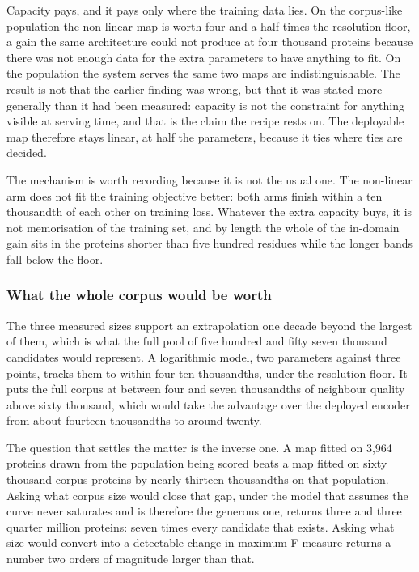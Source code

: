 \begin{table}[htbp]
  \centering
  \caption{A non-linear map against a linear one, both fitted on sixty thousand
  proteins for the same hundred passes, scored on both populations without refitting.
  $^{\dagger}$~below the resolution floor of Section~\ref{sec:exp15-floor}.}
  \label{tab:exp15-capacity}
  
\end{table}

Capacity pays, and it pays only where the training data lies. On the corpus-like
population the non-linear map is worth four and a half times the resolution floor, a
gain the same architecture could not produce at four thousand proteins because there
was not enough data for the extra parameters to have anything to fit. On the population
the system serves the same two maps are indistinguishable. The result is not that the
earlier finding was wrong, but that it was stated more generally than it had been
measured: capacity is not the constraint for anything visible at serving time, and that
is the claim the recipe rests on. The deployable map therefore stays linear, at half the
parameters, because it ties where ties are decided.

The mechanism is worth recording because it is not the usual one. The non-linear arm
does not fit the training objective better: both arms finish within a ten thousandth of
each other on training loss. Whatever the extra capacity buys, it is not memorisation of
the training set, and by length the whole of the in-domain gain sits in the proteins
shorter than five hundred residues while the longer bands fall below the floor.

\subsubsection{What the whole corpus would be worth}

The three measured sizes support an extrapolation one decade beyond the largest of them,
which is what the full pool of five hundred and fifty seven thousand candidates would
represent. A logarithmic model, two parameters against three points, tracks them to
within four ten thousandths, under the resolution floor. It puts the full corpus at
between four and seven thousandths of neighbour quality above sixty thousand, which
would take the advantage over the deployed encoder from about fourteen thousandths to
around twenty.

The question that settles the matter is the inverse one. A map fitted on 3,964 proteins
drawn from the population being scored beats a map fitted on sixty thousand corpus
proteins by nearly thirteen thousandths on that population. Asking what corpus size
would close that gap, under the model that assumes the curve never saturates and is
therefore the generous one, returns three and three quarter million proteins: seven
times every candidate that exists. Asking what size would convert into a detectable
change in maximum F-measure returns a number two orders of magnitude larger than that.

